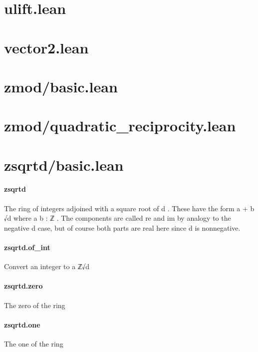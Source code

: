 \documentclass{article}
\begin{document}
\section{ulift.lean}\section{vector2.lean}\section{zmod/basic.lean}\section{zmod/quadratic\_reciprocity.lean}\section{zsqrtd/basic.lean}\paragraph{zsqrtd}
\par
The ring of integers adjoined with a square root of 
\colorbox[RGB]{253,246,227}{{{{\color[RGB]{101, 123, 131} d }}}}.
These have the form 
\colorbox[RGB]{253,246,227}{{{{\color[RGB]{101, 123, 131} a  }}}{{{\color[RGB]{181, 137, 0} + }}}{{{\color[RGB]{101, 123, 131}  b √d }}}} where 
\colorbox[RGB]{253,246,227}{{{{\color[RGB]{101, 123, 131} a b : ℤ }}}}. The components
are called 
\colorbox[RGB]{253,246,227}{{{{\color[RGB]{101, 123, 131} re }}}} and 
\colorbox[RGB]{253,246,227}{{{{\color[RGB]{101, 123, 131} im }}}} by analogy to the negative 
\colorbox[RGB]{253,246,227}{{{{\color[RGB]{101, 123, 131} d }}}} case,
but of course both parts are real here since 
\colorbox[RGB]{253,246,227}{{{{\color[RGB]{101, 123, 131} d }}}} is nonnegative.
\paragraph{zsqrtd.of\_int}
\par
Convert an integer to a 
\colorbox[RGB]{253,246,227}{{{{\color[RGB]{101, 123, 131} ℤ√d }}}}\paragraph{zsqrtd.zero}
\par
The zero of the ring
\paragraph{zsqrtd.one}
\par
The one of the ring
\end{document}
